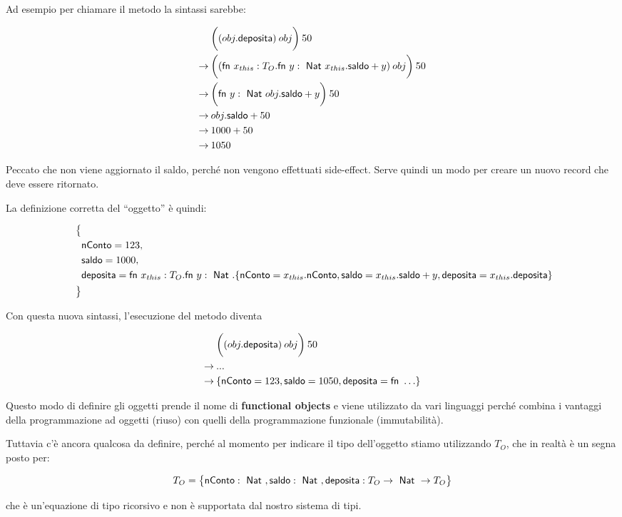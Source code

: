 \noindent Ad esempio per chiamare il metodo  la sintassi sarebbe:

\begin{align*}
\quad &\bigg( (obj.\text{deposita}) \: obj \bigg) \: 50  \\
\rightarrow\: & \bigg( (\fn x_{this} : T_O . \fn y : \Nat  x_{this}.\text{saldo} + y )\: obj \bigg)\: 50  \\
\rightarrow\: & \bigg( \fn y : \Nat obj.\text{saldo} + y \bigg)\: 50  \\
\rightarrow\: & obj.\text{saldo} + 50 \\
\rightarrow\: & 1000 + 50 \\
\rightarrow\: & 1050
\end{align*}

\noindent Peccato che non viene aggiornato il saldo, perché non vengono effettuati side-effect.
Serve quindi un modo per creare un nuovo record che deve essere ritornato.

La definizione corretta del ``oggetto'' è quindi:

\begin{align*}
\big\{& \\
\quad & \text{nConto} = 123,  \\
\quad &\text{saldo} = 1000, \\
\quad &\text{deposita} = \fn x_{this} : T_O . \fn y : \Nat. \{ \text{nConto} = x_{this}.\text{nConto}, \text{saldo} = x_{this}.\text{saldo} + y, \text{deposita} = x_{this}.\text{deposita}\}  \\
\big\}&
\end{align*}

\noindent Con questa nuova sintassi, l'esecuzione del metodo diventa

\begin{align*}
\quad &\bigg( (obj.\text{deposita}) \: obj \bigg) \: 50  \\
\rightarrow\: & ... \\
\rightarrow\: & \{ \text{nConto} = 123, \text{saldo} = 1050, \text{deposita} = \fn \ldots \} 
\end{align*}

\noindent Questo modo di definire gli oggetti prende il nome di \textbf{functional objects} e viene utilizzato da vari linguaggi perché combina i vantaggi della programmazione ad oggetti (riuso) con quelli della programmazione funzionale (immutabilità).

Tuttavia c'è ancora qualcosa da definire, perché al momento per indicare il tipo dell'oggetto stiamo utilizzando $T_O$, che in realtà è un segna posto per:

$$
T_O = \big\{ \text{nConto}: \Nat, \text{saldo} : \Nat, \text{deposita}: T_O \rightarrow \Nat \rightarrow T_O \big\}
$$

\noindent che è un'equazione di tipo ricorsivo e non è supportata dal nostro sistema di tipi.
















